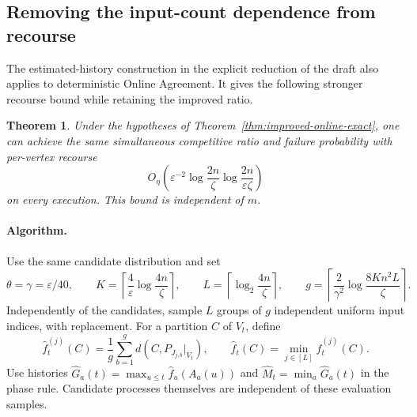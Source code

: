 \documentclass[11pt]{article}
\newtheorem{theorem}{Theorem}[section]
\begin{document}
\subsection{Removing the input-count dependence from recourse}

The estimated-history construction in the explicit reduction of the draft
also applies to deterministic Online Agreement. It gives the following
stronger recourse bound while retaining the improved ratio.

\begin{theorem}\label{thm:improved-online-estimated}
Under the hypotheses of Theorem~\ref{thm:improved-online-exact}, one can
achieve the same simultaneous competitive ratio and failure probability
with per-vertex recourse
\[
 O_\eta\!\left(
   \varepsilon^{-2}\log\frac{2n}{\zeta}
                    \log\frac{2n}{\varepsilon\zeta}
 \right)
\]
on every execution. This bound is independent of $m$.
\end{theorem}

\paragraph{Algorithm.}
Use the same candidate distribution and set
\[
 \theta=\gamma=\varepsilon/40,\qquad
 K=\left\lceil\frac4\varepsilon\log\frac{4n}{\zeta}\right\rceil,
 \qquad L=\left\lceil\log_2\frac{4n}{\zeta}\right\rceil,
 \qquad g=\left\lceil\frac{2}{\gamma^2}
                   \log\frac{8Kn^2L}{\zeta}\right\rceil.
\]
Independently of the candidates, sample $L$ groups of $g$ independent
uniform input indices, with replacement. For a partition $C$ of $V_t$,
define
\[
 \widehat f_t^{(j)}(C)=\frac1g\sum_{b=1}^g d(C,P_{J_{j,b}}|_{V_t}),
 \qquad \widehat f_t(C)=\min_{j\in[L]}\widehat f_t^{(j)}(C).
\]
Use histories
$\widehat G_a(t)=\max_{u\le t}\widehat f_u(A_a(u))$ and
$\widehat M_t=\min_a\widehat G_a(t)$ in the phase rule.
Candidate processes themselves are independent of these evaluation samples.
\end{document}
